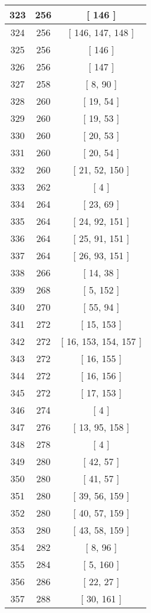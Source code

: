 \begin{center}
\begin{longtable}[H]{|| c c c ||}
\hline
323 & 256 & [ 146 ] \\ 
\hline
324 & 256 & [ 146, 147, 148 ] \\ 
\hline
325 & 256 & [ 146 ] \\ 
\hline
326 & 256 & [ 147 ] \\ 
\hline
327 & 258 & [ 8, 90 ] \\ 
\hline
328 & 260 & [ 19, 54 ] \\ 
\hline
329 & 260 & [ 19, 53 ] \\ 
\hline
330 & 260 & [ 20, 53 ] \\ 
\hline
331 & 260 & [ 20, 54 ] \\ 
\hline
332 & 260 & [ 21, 52, 150 ] \\ 
\hline
333 & 262 & [ 4 ] \\ 
\hline
334 & 264 & [ 23, 69 ] \\ 
\hline
335 & 264 & [ 24, 92, 151 ] \\ 
\hline
336 & 264 & [ 25, 91, 151 ] \\ 
\hline
337 & 264 & [ 26, 93, 151 ] \\ 
\hline
338 & 266 & [ 14, 38 ] \\ 
\hline
339 & 268 & [ 5, 152 ] \\ 
\hline
340 & 270 & [ 55, 94 ] \\ 
\hline
341 & 272 & [ 15, 153 ] \\ 
\hline
342 & 272 & [ 16, 153, 154, 157 ] \\ 
\hline
343 & 272 & [ 16, 155 ] \\ 
\hline
344 & 272 & [ 16, 156 ] \\ 
\hline
345 & 272 & [ 17, 153 ] \\ 
\hline
346 & 274 & [ 4 ] \\ 
\hline
347 & 276 & [ 13, 95, 158 ] \\ 
\hline
348 & 278 & [ 4 ] \\ 
\hline
349 & 280 & [ 42, 57 ] \\ 
\hline
350 & 280 & [ 41, 57 ] \\ 
\hline
351 & 280 & [ 39, 56, 159 ] \\ 
\hline
352 & 280 & [ 40, 57, 159 ] \\ 
\hline
353 & 280 & [ 43, 58, 159 ] \\ 
\hline
354 & 282 & [ 8, 96 ] \\ 
\hline
355 & 284 & [ 5, 160 ] \\ 
\hline
356 & 286 & [ 22, 27 ] \\ 
\hline
357 & 288 & [ 30, 161 ] \\ 

\end{longtable}
\end{center}
